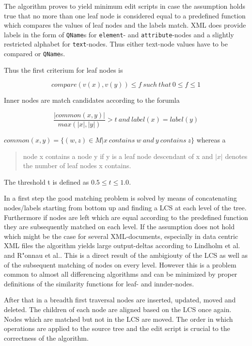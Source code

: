 The algorithm proves to yield minimum edit scripts in case the assumption holds true that no more than one leaf node is considered equal to a predefined function which compares the values of leaf nodes and the labels match. XML does provide labels in the form of \texttt{QName}s for \texttt{element}- and \texttt{attribute}-nodes and a slightly restricted alphabet for \texttt{text}-nodes. Thus either text-node values have to be compared or \texttt{QName}s.

Thus the first criterium for leaf nodes is 

\begin{equation} 
compare(v(x), v(y)) \leq f\ such\ that\ 0 \leq f \leq 1
\end{equation}

Inner nodes are match candidates according to the forumla 

\begin{equation}
\frac{|common(x, y)|}{max(|x|,|y|)} > t\ and\ label(x) = label(y)
\end{equation}

$common(x,y) = \{(w,z) \in M | x\ contains\ w\ and\ y\ contains\ z\}$ whereas a \begin{quote}node x contains a node y if y is a leaf node descendant of x and $|x|$ denotes the number of leaf nodes x contains.\end{quote} The threshold t is defined as $0.5 \leq t \leq 1.0$.

In a first step the good matching problem is solved by means of concatenating nodes/labels starting from bottom up and finding a LCS at each level of the tree. Furthermore if nodes are left which are equal according to the predefined function they are subsequently matched on each level. If the assumption does not hold which might be the case for several XML-documents, especially in data centric XML files the algorithm yields large output-deltas according to Lindholm et al.\cite{lindholm2006fast} and R"onnau et al.\cite{ronnau2009efficient}. This is a direct result of the ambigiouty of the LCS as well as of the subsequent matching of nodes on every level. However this is a problem common to almost all differencing algorithms and can be minimized by proper definitions of the similarity functions for leaf- and innder-nodes.

After that in a breadth first traversal nodes are inserted, updated, moved and deleted. The children of each node are aligned based on the LCS once again. Nodes which are matched but not in the LCS are moved. The order in which operations are applied to the source tree and the edit script is crucial to the correctness of the algorithm.

